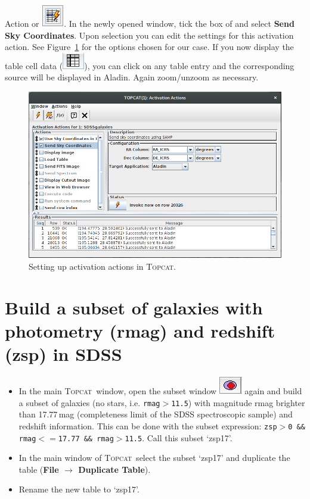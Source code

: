 \documentclass [a4paper, 12pt]{article}
\newcommand{\aladin}{{\textsc{A}{ladin}}}
\newcommand{\topcat}{{\textsc{Topcat}}}
\begin{document}
\begin{itemize}
\begin{itemize}
{    Action} or \includegraphics[width=0.035  
    \textwidth]{../images/topcat_button_activationaction.png}. In the newly 
    opened window, tick the box of and select \textbf{Send Sky Coordinates}. 
    Upon selection you can edit the settings for this activation action. See 
    Figure~\ref{fig:topcat_activation} for the options chosen for our case. If 
    you now display the table cell data (\includegraphics[width=0.035  
    \textwidth]{../images/topcat_button_open-tab.jpg}), you can click on any 
    table entry 
    and the corresponding source will be displayed in \aladin. Again 
    zoom/unzoom as necessary. 
\end{itemize}
\end{itemize}

\begin{figure}[H]
     \center
     \includegraphics[width=0.6 
     \textwidth]{../images/topcat_window_activationaction.png}
     \caption{Setting up activation actions in \topcat.}
     \label{fig:topcat_activation}
\end{figure}

\section{Build a subset of galaxies with photometry (rmag) and redshift (zsp) 
in SDSS}

\begin{itemize}
\item In the main \topcat\ window, open the subset window  
\includegraphics[width=0.04  \textwidth]{../images/topcat_button_subset.jpg} 
again and 
build a subset of galaxies (no stars, i.e. \texttt{rmag$>$11.5}) with magnitude 
rmag brighter than 17.77\,mag (completeness limit of the SDSS spectroscopic 
sample) and redshift information. This can be done with the subset expression: 
\texttt{zsp$>$0 \&\& rmag$<=$17.77 \&\& rmag$>$11.5}. Call this subset `zsp17'.
\item In the main window of \topcat\ select the subset `zsp17' and duplicate the table (\textbf{File $\rightarrow$ Duplicate Table}).
\item Rename the new table to `zsp17'. 
\end{itemize}
\end{document}
